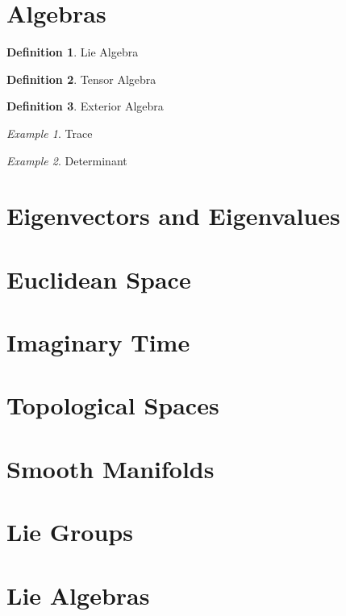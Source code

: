 \documentclass[12pt]{article}
\theoremstyle{definition}
\newtheorem{definition}{Definition}[section]
\theoremstyle{remark}
\theoremstyle{example}
\newtheorem{example}{Example}
\begin{document}
\section{Algebras}

\begin{definition}
	Lie Algebra
\end{definition}

\begin{definition}
	Tensor Algebra
\end{definition}

\begin{definition}
	Exterior Algebra
\end{definition}

\begin{example}
	Trace
\end{example}

\begin{example}
	Determinant
\end{example}

\section{Eigenvectors and Eigenvalues}

\section{Euclidean Space}

\section{Imaginary Time}

\section{Topological Spaces}

\section{Smooth Manifolds}

\section{Lie Groups}

\section{Lie Algebras}
\end{document}
